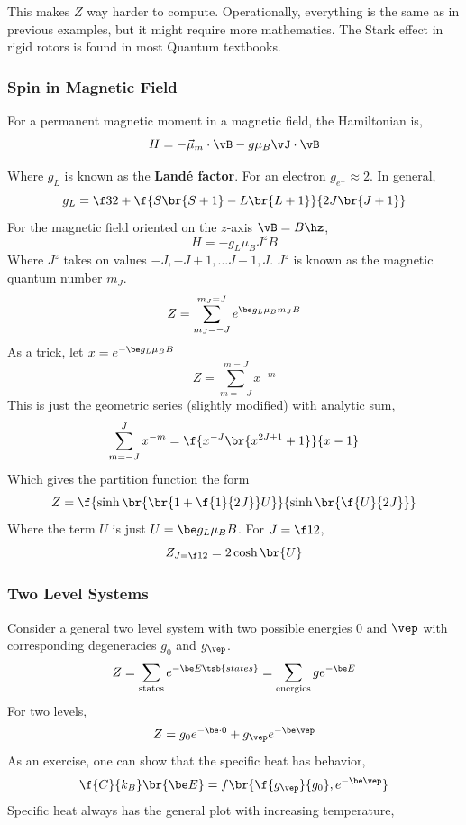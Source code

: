\documentclass{article}
\begin{document}
This makes $Z$ way harder to compute. Operationally, everything is the same as in previous examples, but it might require more mathematics. The Stark effect in rigid rotors is found in most Quantum textbooks.

\subsubsection{Spin in Magnetic Field}

For a permanent magnetic moment in a magnetic field, the Hamiltonian is,
\[ H = - \vec{\mu}_m \cdot \vB - g \mu_B \vJ \cdot \vB \]{
Where $g_L$ is known as the \textbf{Landé factor}. For an electron $g_{e^-} \approx 2$. In general,
\[ g_L = \f32 + \f{S\br{S+1} - L\br{L+1}}{2J\br{J+1}} \]
For the magnetic field oriented on the $z$-axis $\vB = B \hz$,
\[ H = - g_L \mu_B J^{z} B \]
Where $J^z$ takes on values $-J, -J+1, \ldots J-1, J$. $J^z$ is known as the magnetic quantum number $m_J$.
\[ Z = \sum_{m_J = -J}^{m_J = J} e^{\be g_L \mu_B m_J B} \]
As a trick, let $x = e^{-\be g_L \mu_B B}$
\[ Z = \sum_{m = -J}^{m = J} x^{-m} \]
This is just the geometric series (slightly modified) with analytic sum,
\[ \sum_{m = -J}^{J} x^{-m} = \f{x^{-J}\br{x^{2J+1} + 1}}{x-1} \]
Which gives the partition function the form
\[ Z = \f{\sinh\br{\br{1 + \f{1}{2J}}U}}{\sinh\br{\f{U}{2J}}} \]
Where the term $U$ is just $U=\be g_L\mu_B B$. For $J = \f12$,
\[ Z_{J=\f12} = 2 \cosh\br{U} \]
\subsubsection{Two Level Systems}
Consider a general two level system with two possible energies $0$ and $\vep$ with corresponding degeneracies $g_0$ and $g_\vep$.
\[ Z = \sum_{\text{states}} e^{-\be E\tsb{states}} = \sum_{\text{energies}} g e^{-\be E} \]
For two levels,
\[ Z = g_0 e^{-\be \cdot 0} + g_\vep e^{-\be \vep} \]
As an exercise, one can show that the specific heat has behavior,
\[ \f{C}{k_B} \br{\be E} = f\br{\f{g_\vep}{g_0}, e^{-\be \vep}} \]
Specific heat always has the general plot with increasing temperature,

\begin{center}
\end{center}

}
\end{document}
